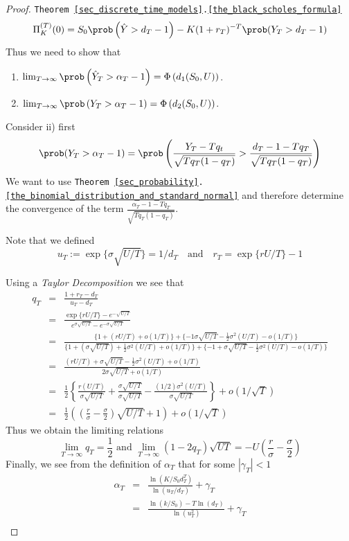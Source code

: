 \documentclass[11pt,a4paper]{article}
\begin{document}
\begin{proof}{\texttt{Theorem  \ref{sec_discrete_time_models}.\ref{the_black_scholes_formula}}}
    \[ \Pi_K^{(T)}(0)=S_0\prob\left(\hat{Y}>d_T-1\right)-K(1+r_T)^{-T}\prob(Y_T>d_T-1) \]
    Thus we need to show that
    \begin{enumerate}
      \item $\lim_{T\to\infty}\prob\left(\hat{Y}_T>\alpha_T-1\right)=\Phi\left(d_1(S_0,U)\right)$.
      \item $\lim_{T\to\infty}\prob\left(Y_T>\alpha_T-1\right)=\Phi\left(d_2(S_0,U)\right)$.
    \end{enumerate}
    Consider ii) first
    \[ \prob(Y_T>\alpha_T-1)=\prob\left(\frac{Y_T-Tq_t}{\sqrt{Tq_T(1-q_T)}}>\frac{d_T-1-Tq_T}{\sqrt{Tq_T(1-q_T)}}\right) \]
    We want to use \texttt{Theorem \ref{sec_probability}.\ref{the_binomial_distribution_and_standard_normal}} and therefore determine the convergence of the term $\frac{\alpha_T-1-Tq_T}{\sqrt{Tq_T(1-q_T)}}$.
    \par Note that we defined
    \[ u_T:=\exp\{\sigma\sqrt{U/T}\}=1/d_T\quad\text{and}\quad r_T=\exp\{rU/T\}-1 \]
    \par Using a \textit{Taylor Decomposition} we see that
    \[\begin{array}{rcl}
      q_T&=&\frac{1+r_T-d_T}{u_T-d_T}\\
      &=&\frac{\exp\{rU/T\}-e^{-\sqrt{U/T}}}{e^{\sigma\sqrt{U/T}}-e^{-\sigma\sqrt{U/T}}}\\
      &=&\frac{\{1+(rU/T)+o(1/T)\}  +\{-1\sigma\sqrt{U/T}-\frac12\sigma^2(U/T)-o(1/T)\}}{\{1+(\sigma\sqrt{U/T})+\frac12\sigma^2(U/T)+o(1/T)\}+\{-1+\sigma\sqrt{U/T}-\frac12\sigma^2(U/T)-o(1/T)\}}\\
      &=&\frac{(rU/T)+\sigma\sqrt{U/T}-\frac12\sigma^2(U/T)+o(1/T)}{2\sigma\sqrt{U/T}+o(1/T)}\\
      &=&\frac12\left\{\frac{r(U/T)}{\sigma\sqrt{U/T}}+\frac{\sigma\sqrt{U/T}}{\sigma\sqrt{U/T}}-\frac{(1/2)\sigma^2(U/T)}{\sigma\sqrt{U/T}}\right\}+o(1/\sqrt{T})\\
      &=&\frac12\left(\left(\frac{r}\sigma-\frac\sigma2\right)\sqrt{U/T}+1\right)+o(1/\sqrt{T})
    \end{array}\]
    Thus we obtain the limiting relations
    \[ \lim_{T\to\infty}q_T=\frac12\text{ and }\lim_{T\to\infty}(1-2q_T)\sqrt{UT}=-U\left(\frac{r}{\sigma}-\frac\sigma2\right) \]
    Finally, we see from the definition of $\alpha_T$ that for some $|\gamma_T|<1$
    \[\begin{array}{rcl}
      \alpha_T&=&\frac{\ln(K/S_0d_T^T)}{\ln(u_T/d_T)}+\gamma_T\\
      &=&\frac{\ln(k/S_0)-T\ln(d_T)}{\ln(u_T^2)}+\gamma_T\\

\end{array}\]
\end{proof}
\end{document}
